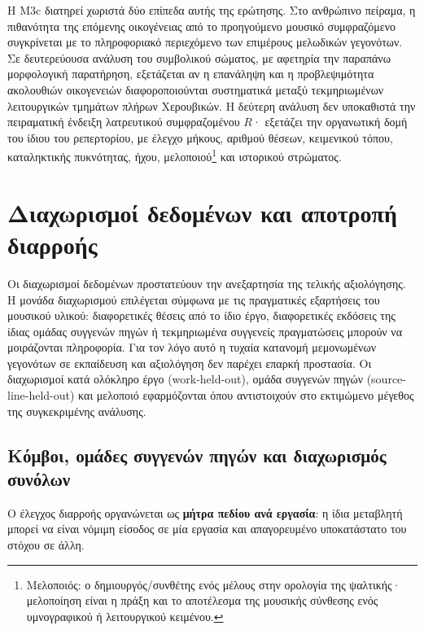 \documentclass[11pt,a4paper]{article}
\begin{document}
Η M3c διατηρεί χωριστά δύο επίπεδα αυτής της ερώτησης. Στο ανθρώπινο πείραμα, η πιθανότητα της επόμενης οικογένειας από το προηγούμενο μουσικό συμφραζόμενο συγκρίνεται με το πληροφοριακό περιεχόμενο των επιμέρους μελωδικών γεγονότων. Σε δευτερεύουσα ανάλυση του συμβολικού σώματος, με αφετηρία την παραπάνω μορφολογική παρατήρηση, εξετάζεται αν η επανάληψη και η προβλεψιμότητα ακολουθιών οικογενειών διαφοροποιούνται συστηματικά μεταξύ τεκμηριωμένων λειτουργικών τμημάτων πλήρων Χερουβικών. Η δεύτερη ανάλυση δεν υποκαθιστά την πειραματική ένδειξη λατρευτικού συμφραζομένου $R$· εξετάζει την οργανωτική δομή του ίδιου του ρεπερτορίου, με έλεγχο μήκους, αριθμού θέσεων, κειμενικού τόπου, καταληκτικής πυκνότητας, ήχου, μελοποιού\footnote{Μελοποιός: ο δημιουργός/συνθέτης ενός μέλους στην ορολογία της ψαλτικής· μελοποίηση είναι η πράξη και το αποτέλεσμα της μουσικής σύνθεσης ενός υμνογραφικού ή λειτουργικού κειμένου.} και ιστορικού στρώματος.

\section{Διαχωρισμοί δεδομένων και αποτροπή διαρροής}\label{app:splits}

Οι διαχωρισμοί δεδομένων προστατεύουν την ανεξαρτησία της τελικής αξιολόγησης. Η μονάδα διαχωρισμού επιλέγεται σύμφωνα με τις πραγματικές εξαρτήσεις του μουσικού υλικού: διαφορετικές θέσεις από το ίδιο έργο, διαφορετικές εκδόσεις της ίδιας ομάδας συγγενών πηγών ή τεκμηριωμένα συγγενείς πραγματώσεις μπορούν να μοιράζονται πληροφορία. Για τον λόγο αυτό η τυχαία κατανομή μεμονωμένων γεγονότων σε εκπαίδευση και αξιολόγηση δεν παρέχει επαρκή προστασία. Οι διαχωρισμοί κατά ολόκληρο έργο (work-held-out), ομάδα συγγενών πηγών (source-line-held-out) και μελοποιό εφαρμόζονται όπου αντιστοιχούν στο εκτιμώμενο μέγεθος της συγκεκριμένης ανάλυσης.

\subsection{Κόμβοι, ομάδες συγγενών πηγών και διαχωρισμός συνόλων}\label{app:splits-nodes}

Ο έλεγχος διαρροής οργανώνεται ως \textbf{μήτρα πεδίου ανά εργασία}: η ίδια μεταβλητή μπορεί να είναι νόμιμη είσοδος σε μία εργασία και απαγορευμένο υποκατάστατο του στόχου σε άλλη.
\end{document}
